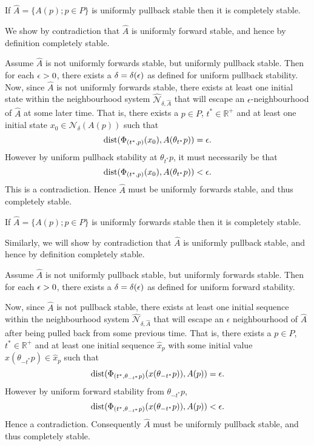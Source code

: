\begin{lemma}
\label{upscslem}
If $\hat{A} = \{A(p) ; p \in P \}$ is uniformly pullback stable then it is
completely stable.
\end{lemma}
\begin{prf}
We show by contradiction that $\hat{A}$ is uniformly forward stable, and
hence by definition completely stable.

Assume $\hat{A}$ is not uniformly forwards stable, but uniformly pullback
stable. Then for each $\epsilon > 0$, there exists a $\delta = \delta( \epsilon )$ as
defined for uniform pullback stability. Now, since $\hat{A}$ is not uniformly
forwards stable, there exists at least one initial state within the
neighbourhood system $\hat{\mathcal{N}}_{\delta, \hat{A}}$ that will escape an
$\epsilon$-neighbourhood of $\hat{A}$ at some later time. That is, there exists
a $p \in P$, $t^* \in \mathbb{R}^+$ and at least one initial state $x_0 \in
\mathcal{N}_{\delta}(A(p))$ such that
\[ {\rm dist}( \Phi_{(t^*, p)}(x_0), A(\theta_{t^*}p) ) = \epsilon. \]
However by uniform pullback stability at $\theta_{t^*}p$, it must necessarily
be that
\[ {\rm dist}( \Phi_{(t^*, p)}(x_0), A(\theta_{t^*}p) ) < \epsilon. \]
This is a contradiction. Hence $\hat{A}$ must be uniformly forwards stable,
and thus completely stable.
\end{prf}

\begin{lemma}
\label{ufscslem}
If $\hat{A} = \{A(p) ; p \in P \}$ is uniformly forwards stable
then it is completely stable.
\end{lemma}
\begin{prf}
Similarly, we will show by contradiction that $\hat{A}$ is uniformly pullback
stable, and hence by definition completely stable.

Assume $\hat{A}$ is not uniformly pullback stable, but uniformly forwards
stable. Then for each $\epsilon > 0$, there exists a $\delta = \delta( \epsilon )$ as
defined for uniform forward stability.

Now, since $\hat{A}$ is not pullback stable, there exists at least one initial
sequence within the neighbourhood system $\hat{\mathcal{N}}_{\delta, \hat{A}}$
that will escape an $\epsilon$ neighbourhood of $\hat{A}$ after being pulled
back from some previous time. That is, there exists a $p \in P$, $t^* \in
\mathbb{R}^+$ and at least one initial sequence $\hat{x}_p$ with some initial
value $x(\theta_{-t^*}p) \in \hat{x}_p$ such that
\[ {\rm dist}( \Phi_{(t^*, \theta_{-t^*}p)}(x(\theta_{-t^*}p)), A(p) ) = \epsilon. \]
However by uniform forward stability from $\theta_{-t^*}p$,
\[ {\rm dist}( \Phi_{(t^*, \theta_{-t^*}p)}(x(\theta_{-t^*}p)), A(p) ) < \epsilon. \]
Hence a contradiction. Consequently $\hat{A}$ must be uniformly pullback stable,
and thus completely stable.
\end{prf}

